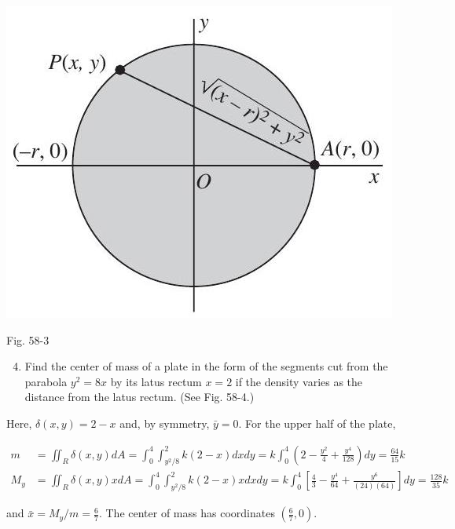\documentclass[10pt]{article}
\begin{document}
\begin{center}
\includegraphics[max width=\textwidth]{2024_04_20_fe2e8e718cc0fcd63d1bg-13}
\end{center}

Fig. 58-3

\begin{enumerate}
  \setcounter{enumi}{3}
  \item Find the center of mass of a plate in the form of the segments cut from the parabola $y^{2}=8 x$ by its latus rectum $x=2$ if the density varies as the distance from the latus rectum. (See Fig. 58-4.)
\end{enumerate}

Here, $\delta(x, y)=2-x$ and, by symmetry, $\bar{y}=0$. For the upper half of the plate,

$$
\begin{aligned}
m & =\iint_{R} \delta(x, y) d A=\int_{0}^{4} \int_{y^{2} / 8}^{2} k(2-x) d x d y=k \int_{0}^{4}\left(2-\frac{y^{2}}{4}+\frac{y^{4}}{128}\right) d y=\frac{64}{15} k \\
M_{y} & =\iint_{R} \delta(x, y) x d A=\int_{0}^{4} \int_{y^{2} / 8}^{2} k(2-x) x d x d y=k \int_{0}^{4}\left[\frac{4}{3}-\frac{y^{4}}{64}+\frac{y^{6}}{(24)(64)}\right] d y=\frac{128}{35} k
\end{aligned}
$$

and $\bar{x}=M_{y} / m=\frac{6}{7}$. The center of mass has coordinates $\left(\frac{6}{7}, 0\right)$.
\end{document}
